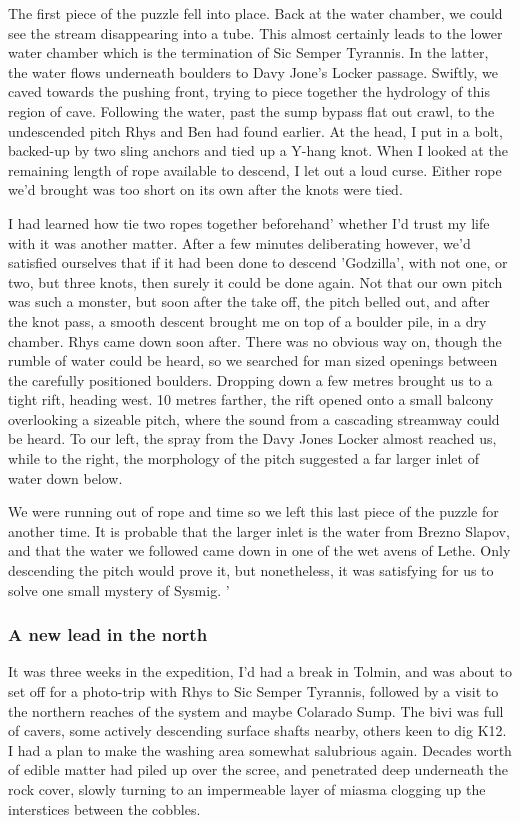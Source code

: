 \documentclass[onecolumn]{book}
\begin{document}
The first piece of the puzzle fell into place. Back at the water chamber, we could see the stream disappearing into a tube. This almost certainly leads to the lower water chamber which is the termination of Sic Semper Tyrannis. In the latter, the water flows underneath boulders to Davy Jone's Locker passage. Swiftly, we caved towards the pushing front, trying to piece together the hydrology of this region of cave. Following the water, past the sump bypass flat out crawl, to the undescended pitch Rhys and Ben had found earlier. At the head, I put in a bolt, backed-up by two sling anchors and tied up a Y-hang knot. When I looked at the remaining length of rope available to descend, I let out a loud curse. Either rope we'd brought was too short on its own after the knots were tied. 

I had learned how tie two ropes together beforehand' whether I'd trust my life with it was another matter. After a few minutes deliberating however, we'd satisfied ourselves that if it had been done to descend 'Godzilla', with not one, or two, but three knots, then surely it could be done again. Not that our own pitch was such a monster, but soon after the take off, the pitch belled out, and after the knot pass, a smooth descent brought me on top of a boulder pile, in a dry chamber. Rhys came down soon after. There was no obvious way on, though the rumble of water could be heard, so we searched for man sized openings between the carefully positioned boulders. Dropping down a few metres brought us to a tight rift, heading west. 10 metres farther, the rift opened onto a small balcony overlooking a sizeable pitch, where the sound from a cascading streamway could be heard. To our left, the spray from the Davy Jones Locker almost reached us, while to the right, the morphology of the pitch suggested a far larger inlet of water down below. 

We were running out of rope and time so we left this last piece of the puzzle for another time. It is probable that the larger inlet is the water from Brezno Slapov, and that the water we followed came down in one of the wet avens of Lethe. Only descending the pitch would prove it, but nonetheless, it was satisfying for us to solve one small mystery of Sysmig.
'
\subsubsection{A new lead in the north}
It was three weeks in the expedition, I'd had a break in Tolmin, and was about to set off for a photo-trip with Rhys to Sic Semper Tyrannis, followed by a visit to the northern reaches of the system and maybe Colarado Sump. The bivi was full of cavers, some actively descending surface shafts nearby, others keen to dig K12. I had a plan to make the washing area somewhat salubrious again. Decades worth of edible matter had piled up over the scree, and penetrated deep underneath the rock cover, slowly turning to an impermeable layer of miasma clogging up the interstices between the cobbles.
\end{document}
